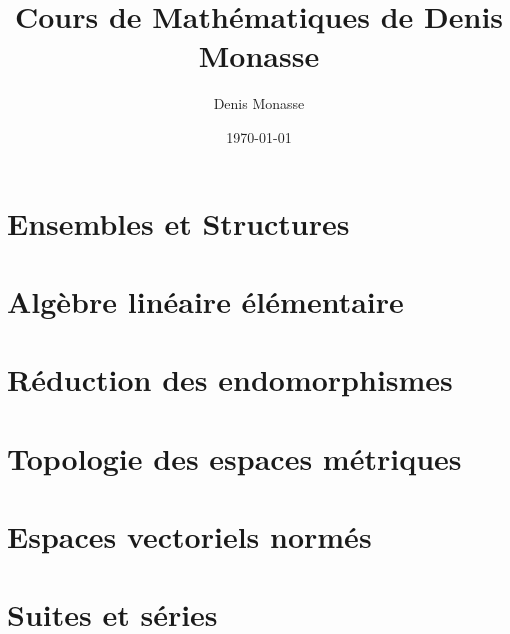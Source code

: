 \documentclass{Math}
\theoremstyle{plain}
\begin{document}
\title{Cours de Mathématiques de Denis Monasse}
\author{Denis Monasse}
\date{\today}
\maketitle

\tableofcontents

\newpage
\part{Ensembles et Structures}


 
 
 
 
\newpage
\part{Algèbre linéaire élémentaire}




 
 
% 
% 
\newpage
\part{Réduction des endomorphismes}
% 
% 
% 
\newpage
\part{Topologie des espaces métriques}
% 
% 
% 
% 
% 
% 
% 
% 
% 
\newpage
\part{Espaces vectoriels normés}
% 
% 
% 
% 
% 
% 

% 
\newpage
\part{Suites et séries}
% 
% 
% 
% 
% 
% 
% 
% 
% 
\newpage
\end{document}

